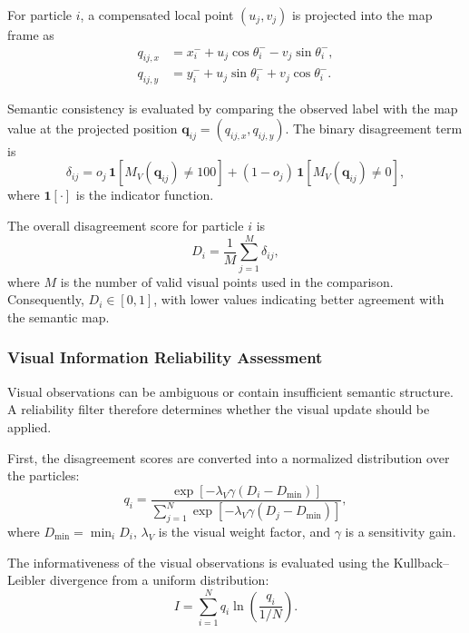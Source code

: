 \documentclass[a4paper,11pt,oneside]{book}
\begin{document}
For particle $i$, a compensated local point $(u_j,v_j)$ is
projected into the map frame as
\begin{align}
    q_{ij,x}
    &=
    x_i^{-}
    +
    u_j\cos\theta_i^{-}
    -
    v_j\sin\theta_i^{-}, \\
    q_{ij,y}
    &=
    y_i^{-}
    +
    u_j\sin\theta_i^{-}
    +
    v_j\cos\theta_i^{-}.
\end{align}

Semantic consistency is evaluated by comparing the observed label
with the map value at the projected position
$\mathbf{q}_{ij}=(q_{ij,x},q_{ij,y})$.
The binary disagreement term is
\begin{equation}
    \delta_{ij}
    =
    o_j\,
    \mathbf{1}\!\left[M_V(\mathbf{q}_{ij})\neq 100\right]
    +
    (1-o_j)\,
    \mathbf{1}\!\left[M_V(\mathbf{q}_{ij})\neq 0\right],
    \label{eq:visual_disagreement}
\end{equation}
where $\mathbf{1}[\cdot]$ is the indicator function.

The overall disagreement score for particle $i$ is
\begin{equation}
    D_i
    =
    \frac{1}{M}
    \sum_{j=1}^{M}\delta_{ij},
    \label{eq:visual_disagreement_score}
\end{equation}
where $M$ is the number of valid visual points used in the
comparison. Consequently, $D_i\in[0,1]$, with lower values
indicating better agreement with the semantic map.

\subsubsection{Visual Information Reliability Assessment}

Visual observations can be ambiguous or contain insufficient
semantic structure. A reliability filter therefore determines
whether the visual update should be applied.

First, the disagreement scores are converted into a normalized
distribution over the particles:
\begin{equation}
    q_i
    =
    \frac{
        \exp\left[-\lambda_V\gamma(D_i-D_{\min})\right]
    }{
        \displaystyle\sum_{j=1}^{N}
        \exp\left[-\lambda_V\gamma(D_j-D_{\min})\right]
    },
    \label{eq:visual_particle_distribution}
\end{equation}
where $D_{\min}=\min_i D_i$, $\lambda_V$ is the visual weight
factor, and $\gamma$ is a sensitivity gain.

The informativeness of the visual observations is evaluated
using the Kullback--Leibler divergence from a uniform
distribution:
\begin{equation}
    I
    =
    \sum_{i=1}^{N}
    q_i\ln\left(\frac{q_i}{1/N}\right).
    \label{eq:visual_kl_divergence}
\end{equation}
\end{document}
